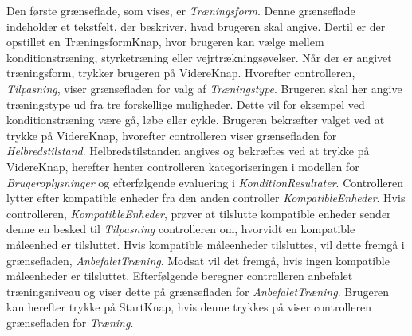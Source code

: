 \noindent
Den første grænseflade, som vises, er \textit{Træningsform}. Denne grænseflade indeholder et tekstfelt, der beskriver, hvad brugeren skal angive. Dertil er der opstillet en TræningsformKnap, hvor brugeren kan vælge mellem konditionstræning, styrketræning eller vejrtrækningsøvelser. Når der er angivet træningsform, trykker brugeren på VidereKnap. Hvorefter controlleren, \textit{Tilpasning}, viser grænsefladen for valg af \textit{Træningstype}. Brugeren skal her angive træningstype ud fra tre forskellige muligheder. Dette vil for eksempel ved konditionstræning være gå, løbe eller cykle. Brugeren bekræfter valget ved at trykke på VidereKnap, hvorefter controlleren viser grænsefladen for \textit{Helbredstilstand}. Helbredstilstanden angives og bekræftes ved at trykke på VidereKnap, herefter henter controlleren kategoriseringen i modellen for \textit{Brugeroplysninger} og efterfølgende evaluering i \textit{KonditionResultater}.
Controlleren lytter efter kompatible enheder fra den anden controller \textit{KompatibleEnheder}. Hvis controlleren, \textit{KompatibleEnheder}, prøver at tilslutte kompatible enheder sender denne en besked til \textit{Tilpasning} controlleren om, hvorvidt en kompatible måleenhed er tilsluttet. Hvis kompatible måleenheder tilsluttes, vil dette fremgå i grænsefladen, \textit{AnbefaletTræning}. Modsat vil det fremgå, hvis ingen kompatible måleenheder er tilsluttet. 
Efterfølgende beregner controlleren anbefalet træningsniveau og viser dette på grænsefladen for \textit{AnbefaletTræning}. Brugeren kan herefter trykke på StartKnap, hvis denne trykkes på viser controlleren grænsefladen for \textit{Træning}. 
